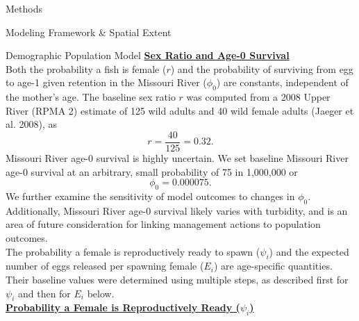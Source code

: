 \documentclass[12pt]{article}
\begin{document}
\begin{section}{Methods}
\begin{subsection}{Modeling Framework \& Spatial Extent}
\begin{subsubsection}{Demographic Population Model}
\textbf{\underline{Sex Ratio and Age-0 Survival}}\\

\vspace{-6pt}Both the probability a fish is female ($r$) and the probability of surviving from egg to age-1 given retention in the Missouri River ($\phi_0$) are constants, independent of the mother's age.  The baseline sex ratio $r$ was computed from a 2008 Upper River (RPMA 2) estimate of 125 wild adults and 40 wild female adults (Jaeger et al. 2008), as
\begin{equation}
r=\frac{40}{125}= 0.32.
\end{equation} 
Missouri River age-0 survival is highly uncertain.  We set baseline Missouri River age-0 survival at an arbitrary, small probability of 75 in 1,000,000 or
\begin{equation}
\phi_0=0.000075.
\end{equation}
We further examine the sensitivity of model outcomes to changes in $\phi_0$.   Additionally, Missouri River age-0 survival likely varies with turbidity, and is an area of future consideration for linking management actions to population outcomes.\\

The probability a female is reproductively ready to spawn ($\psi_i$) and the expected number of eggs released per spawning female ($E_i$) are age-specific quantities.  Their baseline values were determined using multiple steps, as described first for $\psi_i$ and then for $E_i$ below.\\ 

\textbf{\underline{Probability a Female is Reproductively Ready ($\psi_i$)}}\\


\end{subsubsection}
\end{subsection}
\end{section}
\end{document}
